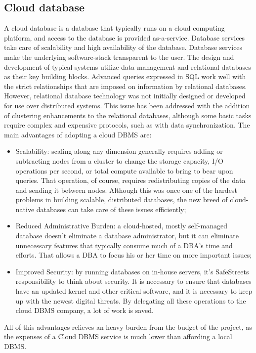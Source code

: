 \subsection{Cloud database}
A cloud database is a database that typically runs on a cloud computing platform, and access to the database is provided as-a-service.
Database services take care of scalability and high availability of the database. Database services make the underlying software-stack transparent to the user.
The design and development of typical systems utilize data management and relational databases as their key building blocks. Advanced queries expressed in SQL work well with the strict relationships that are imposed on information by relational databases. However, relational database technology was not initially designed or developed for use over distributed systems. This issue has been addressed with the addition of clustering enhancements to the relational databases, although some basic tasks require complex and expensive protocols, such as with data synchronization.
\newline The main advantages of adopting a cloud DBMS are:
\begin{itemize}
    \item Scalability: scaling along any dimension generally requires adding or subtracting nodes from a cluster to change the storage capacity, I/O operations per second, or total compute available to bring to bear upon queries. That operation, of course, requires redistributing copies of the data and sending it between nodes. Although this was once one of the hardest problems in building scalable, distributed databases, the new breed of cloud-native databases can take care of these issues efficiently;
    \item Reduced Administrative Burden: a cloud-hosted, mostly self-managed database doesn’t eliminate a database administrator, but it can eliminate unnecessary features that typically consume much of a DBA’s time and efforts. That allows a DBA to focus his or her time on more important issues;
    \item Improved Security: by running databases on in-house servers, it’s SafeStreets responsibility to think about security. It is necessary to ensure that databases have an updated kernel and other critical software, and it is necessary to keep up with the newest digital threats. By delegating all these operations to the cloud DBMS company, a lot of work is saved.
\end{itemize}
All of this advantages relieves an heavy burden from the budget of the project, as the expenses of a Cloud DBMS service is much lower than affording a local DBMS.
